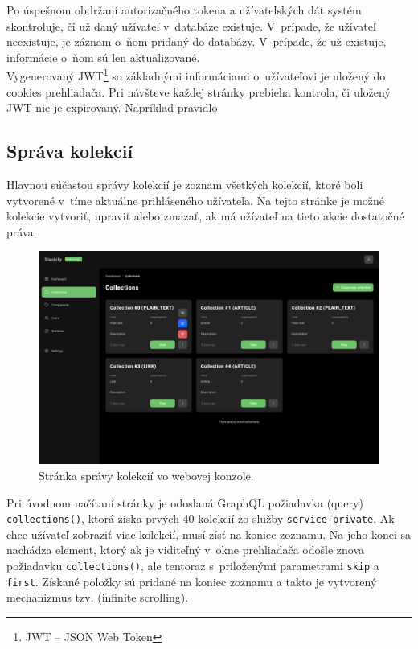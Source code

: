 \noindent Po úspešnom obdržaní autorizačného tokena a užívateľských dát systém skontroluje, či už daný užívateľ v~databáze existuje. V~prípade, že užívateľ neexistuje, je záznam o~ňom pridaný do databázy. V~prípade, že už existuje, informácie o~ňom sú len aktualizované. \\

\noindent Vygenerovaný JWT\footnote{JWT -- JSON Web Token} so základnými informáciami o~užívateľovi je uložený do cookies prehliadača. Pri návšteve každej stránky prebieha kontrola, či uložený JWT nie je expirovaný. Napríklad pravidlo 

\subsection{Správa kolekcií}
Hlavnou súčasťou správy kolekcií je zoznam všetkých kolekcií, ktoré boli vytvorené v~tíme aktuálne prihláseného užívateľa. Na tejto stránke je možné kolekcie vytvoriť, upraviť alebo zmazať, ak má užívateľ na tieto akcie dostatočné práva.

\begin{figure}[h]
	\centering
	\includegraphics[scale=0.085]{obrazky-figures/screenshot_collections}
	\caption{Stránka správy kolekcií vo webovej konzole.}
\end{figure}

\noindent Pri úvodnom načítaní stránky je odoslaná GraphQL požiadavka (query) \texttt{collections()}, ktorá získa prvých 40 kolekcií zo služby \texttt{service-private}. Ak chce užívateľ zobraziť viac kolekcií, musí zísť na koniec zoznamu. Na jeho konci sa nachádza element, ktorý ak je viditeľný v~okne prehliadača odošle znova požiadavku \texttt{collections()}, ale tentoraz s~priloženými parametrami \texttt{skip} a \texttt{first}. Získané položky sú pridané na koniec zoznamu a takto je vytvorený mechanizmus tzv.  (infinite scrolling).


